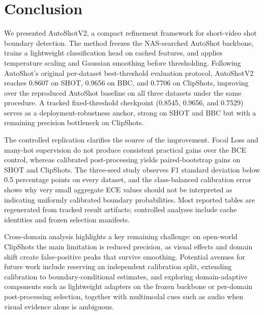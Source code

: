\section{Conclusion}

We presented AutoShotV2, a compact refinement framework for short-video shot
boundary detection. The method freezes the NAS-searched AutoShot backbone,
trains a lightweight classification head on cached features, and applies
temperature scaling and Gaussian smoothing before thresholding. Following AutoShot's original per-dataset best-threshold evaluation protocol, AutoShotV2 reaches 0.8607 on SHOT, 0.9656 on BBC, and 0.7706 on ClipShots, improving over the reproduced AutoShot baseline on all three datasets under the same procedure. A tracked fixed-threshold checkpoint (0.8545, 0.9656, and 0.7529) serves as a deployment-robustness anchor, strong on SHOT and BBC but with a remaining precision bottleneck on ClipShots.

The controlled replication clarifies the source of the improvement. Focal
Loss and many-hot supervision do not produce consistent practical gains over
the BCE control, whereas calibrated post-processing yields paired-bootstrap gains on SHOT and
ClipShots. The three-seed study observes F1 standard deviation below
0.5 percentage points on every dataset, and the class-balanced calibration
error shows why very
small aggregate ECE values should not be interpreted as indicating uniformly calibrated
boundary probabilities. Most reported tables are regenerated from tracked
result artifacts; controlled analyses include cache identities and
frozen selection manifests.

Cross-domain analysis highlights a key remaining challenge: on open-world
ClipShots the main limitation is reduced precision, as visual effects and domain shift
create false-positive peaks that survive smoothing. Potential avenues for future work include reserving an independent calibration split,
extending calibration to boundary-conditional estimates, and exploring
domain-adaptive components such as lightweight adapters on the frozen backbone
or per-domain post-processing selection, together with multimodal cues such as
audio when visual evidence alone is ambiguous.
